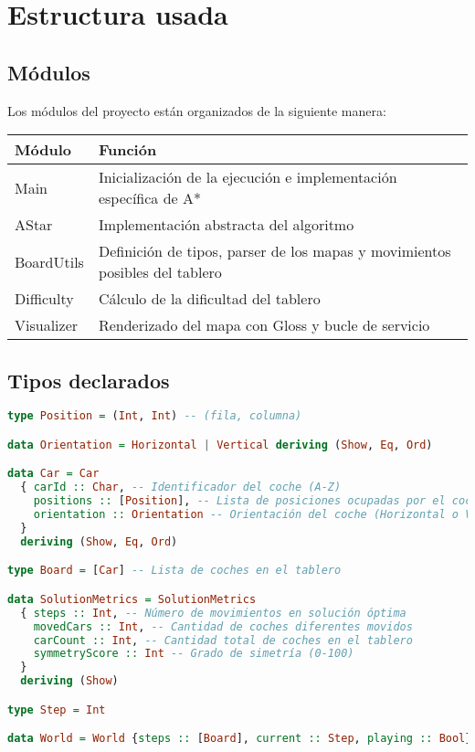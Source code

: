 \documentclass{article}
\begin{document}
\section*{Estructura usada}
\subsection{Módulos}
Los módulos del proyecto están organizados de la siguiente manera:

\begin{table}[h!]
\centering
\begin{tabular}{|l|l|}
\hline
\textbf{Módulo} & \textbf{Función} \\
\hline
Main & Inicialización de la ejecución e implementación específica de A* \\
AStar & Implementación abstracta del algoritmo \\
BoardUtils & Definición de tipos, parser de los mapas y movimientos posibles del tablero \\
Difficulty & Cálculo de la dificultad del tablero \\
Visualizer & Renderizado del mapa con Gloss y bucle de servicio \\
\hline
\end{tabular}
\end{table}


\subsection{Tipos declarados}
\begin{lstlisting}[language=Haskell]
type Position = (Int, Int) -- (fila, columna)

data Orientation = Horizontal | Vertical deriving (Show, Eq, Ord)

data Car = Car
  { carId :: Char, -- Identificador del coche (A-Z)
    positions :: [Position], -- Lista de posiciones ocupadas por el coche
    orientation :: Orientation -- Orientación del coche (Horizontal o Vertical)
  }
  deriving (Show, Eq, Ord)

type Board = [Car] -- Lista de coches en el tablero

data SolutionMetrics = SolutionMetrics
  { steps :: Int, -- Número de movimientos en solución óptima
    movedCars :: Int, -- Cantidad de coches diferentes movidos
    carCount :: Int, -- Cantidad total de coches en el tablero
    symmetryScore :: Int -- Grado de simetría (0-100)
  }
  deriving (Show)

type Step = Int

data World = World {steps :: [Board], current :: Step, playing :: Bool}
\end{lstlisting}
\end{document}
